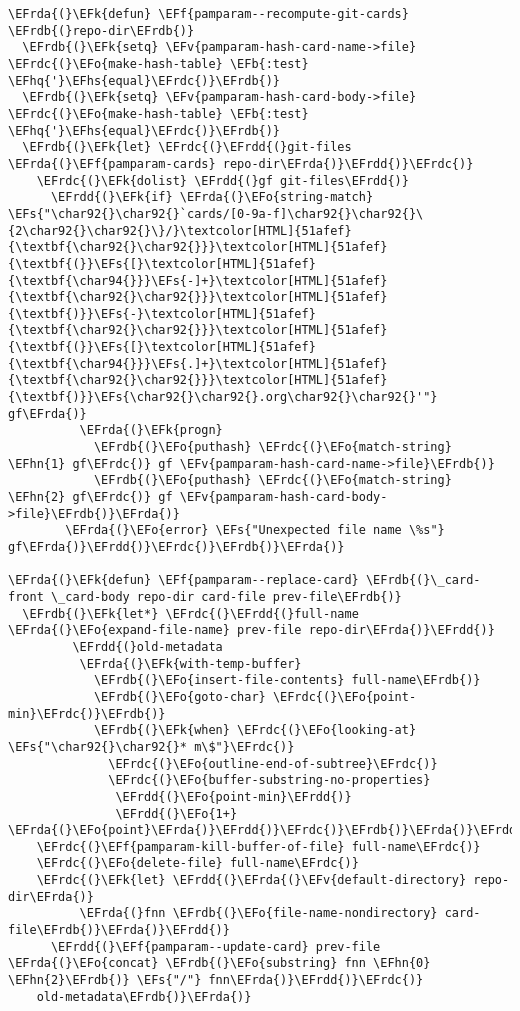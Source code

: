 \documentclass[a4wide,10pt]{article}
\newcommand{\EFs}[1]{\textcolor{EFs}{#1}} %
\newcommand{\EFk}[1]{\textcolor{EFk}{#1}} %
\newcommand{\EFb}[1]{\textcolor{EFb}{#1}} %
\newcommand{\EFf}[1]{\textcolor{EFf}{#1}} %
\newcommand{\EFv}[1]{\textcolor{EFv}{#1}} %
\newcommand{\EFo}[1]{\textcolor{EFo}{#1}} %
\newcommand{\EFhn}[1]{\textcolor{EFhn}{\textbf{#1}}} %
\newcommand{\EFhq}[1]{\textcolor{EFhq}{#1}} %
\newcommand{\EFhs}[1]{\textcolor{EFhs}{#1}} %
\newcommand{\EFrda}[1]{\textcolor{EFrda}{#1}} %
\newcommand{\EFrdb}[1]{\textcolor{EFrdb}{#1}} %
\newcommand{\EFrdc}[1]{\textcolor{EFrdc}{#1}} %
\newcommand{\EFrdd}[1]{\textcolor{EFrdd}{#1}} %
\begin{document}
\begin{Code}
\begin{Verbatim}
\EFrda{(}\EFk{defun} \EFf{pamparam--recompute-git-cards} \EFrdb{(}repo-dir\EFrdb{)}
  \EFrdb{(}\EFk{setq} \EFv{pamparam-hash-card-name->file} \EFrdc{(}\EFo{make-hash-table} \EFb{:test} \EFhq{'}\EFhs{equal}\EFrdc{)}\EFrdb{)}
  \EFrdb{(}\EFk{setq} \EFv{pamparam-hash-card-body->file} \EFrdc{(}\EFo{make-hash-table} \EFb{:test} \EFhq{'}\EFhs{equal}\EFrdc{)}\EFrdb{)}
  \EFrdb{(}\EFk{let} \EFrdc{(}\EFrdd{(}git-files \EFrda{(}\EFf{pamparam-cards} repo-dir\EFrda{)}\EFrdd{)}\EFrdc{)}
    \EFrdc{(}\EFk{dolist} \EFrdd{(}gf git-files\EFrdd{)}
      \EFrdd{(}\EFk{if} \EFrda{(}\EFo{string-match} \EFs{"\char92{}\char92{}`cards/[0-9a-f]\char92{}\char92{}\{2\char92{}\char92{}\}/}\textcolor[HTML]{51afef}{\textbf{\char92{}\char92{}}}\textcolor[HTML]{51afef}{\textbf{(}}\EFs{[}\textcolor[HTML]{51afef}{\textbf{\char94{}}}\EFs{-]+}\textcolor[HTML]{51afef}{\textbf{\char92{}\char92{}}}\textcolor[HTML]{51afef}{\textbf{)}}\EFs{-}\textcolor[HTML]{51afef}{\textbf{\char92{}\char92{}}}\textcolor[HTML]{51afef}{\textbf{(}}\EFs{[}\textcolor[HTML]{51afef}{\textbf{\char94{}}}\EFs{.]+}\textcolor[HTML]{51afef}{\textbf{\char92{}\char92{}}}\textcolor[HTML]{51afef}{\textbf{)}}\EFs{\char92{}\char92{}.org\char92{}\char92{}'"} gf\EFrda{)}
          \EFrda{(}\EFk{progn}
            \EFrdb{(}\EFo{puthash} \EFrdc{(}\EFo{match-string} \EFhn{1} gf\EFrdc{)} gf \EFv{pamparam-hash-card-name->file}\EFrdb{)}
            \EFrdb{(}\EFo{puthash} \EFrdc{(}\EFo{match-string} \EFhn{2} gf\EFrdc{)} gf \EFv{pamparam-hash-card-body->file}\EFrdb{)}\EFrda{)}
        \EFrda{(}\EFo{error} \EFs{"Unexpected file name \%s"} gf\EFrda{)}\EFrdd{)}\EFrdc{)}\EFrdb{)}\EFrda{)}

\EFrda{(}\EFk{defun} \EFf{pamparam--replace-card} \EFrdb{(}\_card-front \_card-body repo-dir card-file prev-file\EFrdb{)}
  \EFrdb{(}\EFk{let*} \EFrdc{(}\EFrdd{(}full-name \EFrda{(}\EFo{expand-file-name} prev-file repo-dir\EFrda{)}\EFrdd{)}
         \EFrdd{(}old-metadata
          \EFrda{(}\EFk{with-temp-buffer}
            \EFrdb{(}\EFo{insert-file-contents} full-name\EFrdb{)}
            \EFrdb{(}\EFo{goto-char} \EFrdc{(}\EFo{point-min}\EFrdc{)}\EFrdb{)}
            \EFrdb{(}\EFk{when} \EFrdc{(}\EFo{looking-at} \EFs{"\char92{}\char92{}* m\$"}\EFrdc{)}
              \EFrdc{(}\EFo{outline-end-of-subtree}\EFrdc{)}
              \EFrdc{(}\EFo{buffer-substring-no-properties}
               \EFrdd{(}\EFo{point-min}\EFrdd{)}
               \EFrdd{(}\EFo{1+} \EFrda{(}\EFo{point}\EFrda{)}\EFrdd{)}\EFrdc{)}\EFrdb{)}\EFrda{)}\EFrdd{)}\EFrdc{)}
    \EFrdc{(}\EFf{pamparam-kill-buffer-of-file} full-name\EFrdc{)}
    \EFrdc{(}\EFo{delete-file} full-name\EFrdc{)}
    \EFrdc{(}\EFk{let} \EFrdd{(}\EFrda{(}\EFv{default-directory} repo-dir\EFrda{)}
          \EFrda{(}fnn \EFrdb{(}\EFo{file-name-nondirectory} card-file\EFrdb{)}\EFrda{)}\EFrdd{)}
      \EFrdd{(}\EFf{pamparam--update-card} prev-file \EFrda{(}\EFo{concat} \EFrdb{(}\EFo{substring} fnn \EFhn{0} \EFhn{2}\EFrdb{)} \EFs{"/"} fnn\EFrda{)}\EFrdd{)}\EFrdc{)}
    old-metadata\EFrdb{)}\EFrda{)}


\end{Verbatim}
\end{Code}
\end{document}
